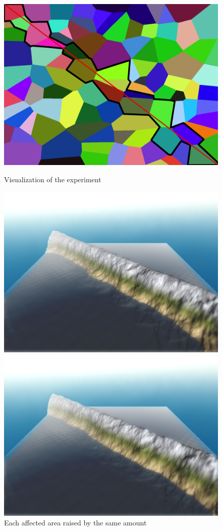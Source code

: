 \documentclass[11pt,a4paper,twoside,openright]{report}
\begin{document}
\begin{figure}[!htb]
  \includegraphics[width=\linewidth]{voronoi100-diagonal.png}
  \caption{Visualization of the experiment}\label{fig:voronoi2diagonal}
\endminipage\hfill
{}
  \includegraphics[width=\linewidth]{mountain-range-normal.png}
  \caption{Each affected area raised by the same amount}\label{fig:mountainrangenormal}
\endminipage\hfill
{}%
  \includegraphics[width=\linewidth]{mountain-range-alteration.png}

\end{figure}
\end{document}
